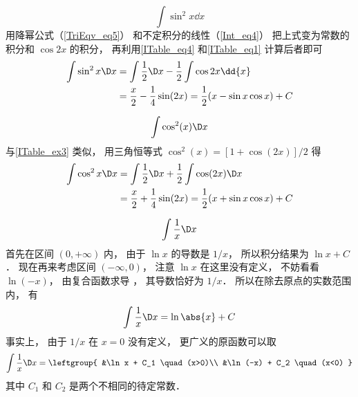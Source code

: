 \begin{exam}{}\label{ITable_ex3}
\begin{equation}
\int \sin^2 x  \dd{x}
\end{equation}
用降幂公式（\autoref{TriEqv_eq5}） 和不定积分的线性（\autoref{Int_eq4}） 把上式变为常数的积分和 $\cos 2x$ 的积分， 再利用\autoref{ITable_eq4} 和\autoref{ITable_eq1} 计算后者即可
\begin{equation}\begin{aligned}
\int \sin^2 x \D x &=  \int \frac 12 \D x - \frac 12\int \cos 2x \dd{x} \\
&=  \frac {x}{2} - \frac 14\sin(2x) = \frac 12 (x - \sin x \cos x) + C
\end{aligned}\end{equation}
\end{exam}

\begin{exam}{}\label{ITable_ex4}
\begin{equation}
\int \cos^2(x) \D x
\end{equation}
与\autoref{ITable_ex3} 类似， 用三角恒等式 $\cos^2(x) =  [1 + \cos(2x)]/2$ 得
\begin{equation}\begin{aligned}
\int \cos^2 x \D x &=  \int \frac 12 \D x + \frac 12\int \cos(2x) \D x \\
&=  \frac {x}{2} + \frac 14\sin(2x) = \frac 12 (x + \sin x \cos x) + C
\end{aligned}\end{equation}
\end{exam}

\begin{exam}{}\label{ITable_ex11}
\begin{equation}
\int \frac 1x \D x
\end{equation}
首先在区间 $(0,+\infty)$ 内， 由于 $\ln x$ 的导数是 $1/x$， 所以积分结果为 $\ln x + C$． 现在再来考虑区间 $(-\infty, 0)$， 注意 $\ln x$ 在这里没有定义， 不妨看看 $\ln(-x)$， 由复合函数求导%
， 其导数恰好为 $1/x$． 所以在除去原点的实数范围内， 有
\begin{equation}
\int \frac 1x \D x = \ln\abs{x} + C
\end{equation}
事实上， 由于 $1/x$ 在 $x=0$ 没有定义， 更广义的原函数可以取
\begin{equation}
\int \frac 1x \D x = \leftgroup{
&\ln x + C_1 \quad (x>0)\\
&\ln (-x) + C_2 \quad (x<0)
}
\end{equation}
其中 $C_1$ 和 $C_2$ 是两个不相同的待定常数．
\end{exam}

